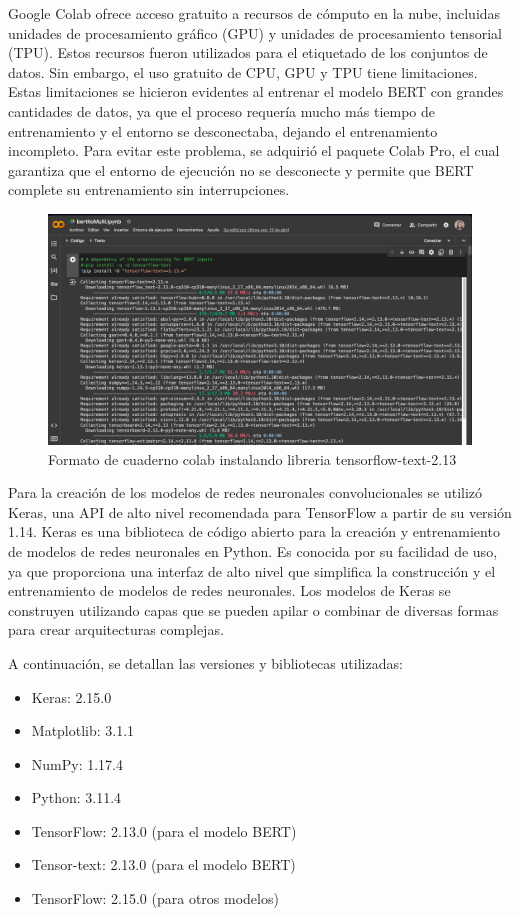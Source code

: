 Google Colab ofrece acceso gratuito a recursos de cómputo en la nube, incluidas unidades de procesamiento gráfico (GPU) y unidades de procesamiento tensorial (TPU). Estos recursos fueron utilizados para el etiquetado de los conjuntos de datos. Sin embargo, el uso gratuito de CPU, GPU y TPU tiene limitaciones. Estas limitaciones se hicieron evidentes al entrenar el modelo BERT con grandes cantidades de datos, ya que el proceso requería mucho más tiempo de entrenamiento y el entorno se desconectaba, dejando el entrenamiento incompleto. Para evitar este problema, se adquirió el paquete Colab Pro, el cual garantiza que el entorno de ejecución no se desconecte y permite que BERT complete su entrenamiento sin interrupciones.

\begin{figure}
	\includegraphics[width=1\textwidth]{capitulo5/figuras/bertito.png}
	\caption{Formato de cuaderno colab instalando libreria tensorflow-text-2.13}
	\label{fig:bertito}
\end{figure}

Para la creación de los modelos de redes neuronales convolucionales se utilizó Keras, una API de alto nivel recomendada para TensorFlow a partir de su versión 1.14. Keras es una biblioteca de código abierto para la creación y entrenamiento de modelos de redes neuronales en Python. Es conocida por su facilidad de uso, ya que proporciona una interfaz de alto nivel que simplifica la construcción y el entrenamiento de modelos de redes neuronales. Los modelos de Keras se construyen utilizando capas que se pueden apilar o combinar de diversas formas para crear arquitecturas complejas.

A continuación, se detallan las versiones y bibliotecas utilizadas:

\begin{itemize}

\item Keras: 2.15.0
\item Matplotlib: 3.1.1
\item NumPy: 1.17.4
\item Python: 3.11.4
\item TensorFlow: 2.13.0 (para el modelo BERT)
\item Tensor-text: 2.13.0 (para el modelo BERT)
\item TensorFlow: 2.15.0 (para otros modelos)

\end{itemize}